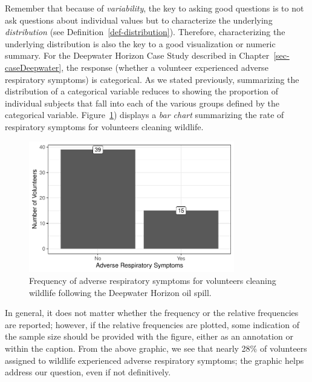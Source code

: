 \documentclass[
  letterpaper,
  DIV=11,
  numbers=noendperiod]{scrreprt}
\theoremstyle{definition}
\theoremstyle{definition}
\theoremstyle{plain}
\theoremstyle{remark}
\begin{document}
Remember that because of \emph{variability}, the key to asking good
questions is to not ask questions about individual values but to
characterize the underlying \emph{distribution} (see
Definition~\ref{def-distribution}). Therefore, characterizing the
underlying distribution is also the key to a good visualization or
numeric summary. For the Deepwater Horizon Case Study described in
Chapter~\ref{sec-caseDeepwater}, the response (whether a volunteer
experienced adverse respiratory symptoms) is categorical. As we stated
previously, summarizing the distribution of a categorical variable
reduces to showing the proportion of individual subjects that fall into
each of the various groups defined by the categorical variable.
Figure~\ref{fig-summaries-deepwater-barchart}) displays a \emph{bar
chart} summarizing the rate of respiratory symptoms for volunteers
cleaning wildlife.

\begin{figure}

{\centering \includegraphics[width=0.8\textwidth,height=\textheight]{./images/fig-summaries-deepwater-barchart-1.pdf}

}

\caption{\label{fig-summaries-deepwater-barchart}Frequency of adverse
respiratory symptoms for volunteers cleaning wildlife following the
Deepwater Horizon oil spill.}

\end{figure}

In general, it does not matter whether the frequency or the relative
frequencies are reported; however, if the relative frequencies are
plotted, some indication of the sample size should be provided with the
figure, either as an annotation or within the caption. From the above
graphic, we see that nearly 28\% of volunteers assigned to wildlife
experienced adverse respiratory symptoms; the graphic helps address our
question, even if not definitively.
\end{document}
